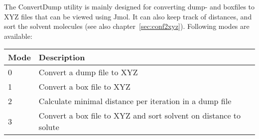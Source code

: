 
The ConvertDump utility is mainly designed for converting dump- and boxfiles to 
XYZ files that can be viewed using Jmol. It can also keep track of distances, 
and sort the solvent molecules (see also chapter~\ref{sec:conf2xyz}). Following 
modes are available:

\begin{tabular}{ll}
	Mode & Description \\ \hline
	0 & Convert a dump file to XYZ \\
	1 & Convert a box file to XYZ \\
	2 & Calculate minimal distance per iteration in a dump file \\
	3 & Convert a box file to XYZ and sort solvent on distance to solute
\end{tabular}